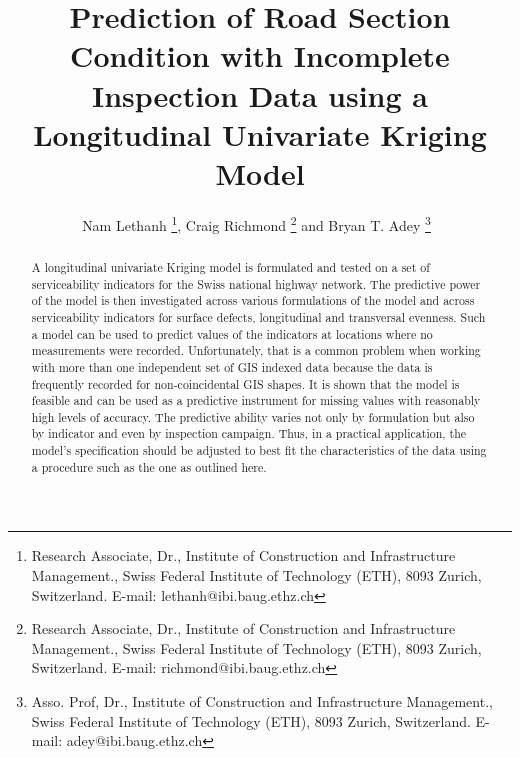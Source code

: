 \documentclass[Journal]{ascelike}
\begin{document}
\title{Prediction of Road Section Condition with Incomplete Inspection Data using a Longitudinal Univariate Kriging 
Model}%
\author{
Nam Lethanh \thanks{Research Associate, Dr., Institute of Construction and Infrastructure Management., Swiss Federal 
Institute of Technology (ETH), 8093 Zurich, Switzerland. E-mail: lethanh@ibi.baug.ethz.ch}, Craig Richmond 
\thanks{Research Associate, Dr., Institute of Construction and Infrastructure Management., Swiss Federal 
Institute of Technology (ETH), 8093 Zurich, Switzerland. E-mail: richmond@ibi.baug.ethz.ch} and Bryan T. Adey%
\thanks{Asso. Prof, Dr., Institute of Construction and Infrastructure Management., Swiss Federal 
Institute of Technology (ETH), 8093 Zurich, Switzerland. E-mail: adey@ibi.baug.ethz.ch}\
}
%
\maketitle
%
\begin{abstract}
A longitudinal univariate Kriging model is formulated and tested on a set of serviceability indicators for the Swiss 
national highway network. The predictive power of the model is then investigated across various formulations of the 
model and across serviceability indicators for surface defects, longitudinal and transversal evenness. Such a model can be used to predict values of the indicators at locations where no measurements were recorded. Unfortunately, that is a common problem when working with more than one independent set of GIS indexed data because the data is frequently recorded for non-coincidental GIS shapes. It is shown that the model is feasible and can be used as a predictive instrument for missing values with reasonably high levels of accuracy. The predictive ability varies not only by formulation but also by indicator and even by inspection campaign. Thus, in a practical application, the model’s specification should be adjusted to best fit the characteristics of the data using a procedure such as the one as outlined here.
\end{abstract}
%
%
%
\end{document}

